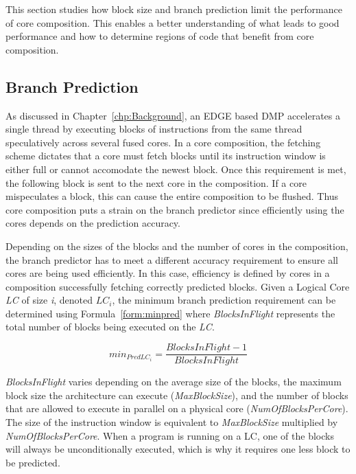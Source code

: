 This section studies how block size and branch prediction limit the performance of core composition.
This enables a better understanding of what leads to good performance and how to determine regions of code that benefit from core composition.


\subsection{Branch Prediction}

As discussed in Chapter~\ref{chp:Background}, an EDGE based DMP accelerates a single thread by executing blocks of instructions from the same thread speculatively across several fused cores. 
In a core composition, the fetching scheme dictates that a core must fetch blocks until its instruction window is either full or cannot accomodate the newest block.
Once this requirement is met, the following block is sent to the next core in the composition.
If a core mispeculates a block, this can cause the entire composition to be flushed.
Thus core composition puts a strain on the branch predictor since efficiently using the cores depends on the prediction accuracy.

Depending on the sizes of the blocks and the number of cores in the composition, the branch predictor has to meet a different accuracy requirement to ensure all cores are being used efficiently.
In this case, efficiency is defined by cores in a composition successfully fetching correctly predicted blocks.
Given a Logical Core \textit{LC} of size \textit{i}, denoted \textit{$LC_i$}, the minimum branch prediction requirement can be determined using Formula~\ref{form:minpred} where \textit{BlocksInFlight} represents the total number of blocks being executed on the \textit{LC}.

\begin{equation}\label{form:minpred}
min_{PredLC_i }= \frac{BlocksInFlight - 1}{BlocksInFlight}
\end{equation}

\textit{BlocksInFlight} varies depending on the average size of the blocks, the maximum block size the architecture can execute (\textit{MaxBlockSize}), and the number of blocks 
that are allowed to execute in parallel on a physical core (\textit{NumOfBlocksPerCore}). 
The size of the instruction window is equivalent to \textit{MaxBlockSize} multiplied by \textit{NumOfBlocksPerCore}.
When a program is running on a LC, one of the blocks will always be unconditionally executed, which is why it requires one less block to be predicted.

